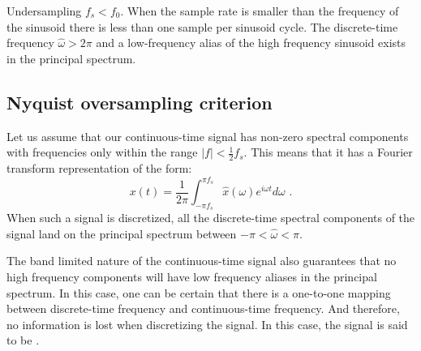 \begin{marginfigure}
\begin{center}
\end{center}
\caption{Undersampling $f_s < f_0$. When the sample rate is smaller than the frequency of the sinusoid there is less than one sample per sinusoid cycle. The discrete-time frequency $\hat{\omega}>2\pi$ and a low-frequency alias of the high frequency sinusoid exists in the principal spectrum.}
\label{fig:undersampling}
\end{marginfigure}

\subsection{Nyquist oversampling criterion}
Let us assume that our continuous-time signal has non-zero spectral components with frequencies only within the range $|f|<\frac{1}{2}f_s$. This means that it has a Fourier transform representation of the form:
\begin{equation}
    x(t) = \frac{1}{2\pi}\int_{-\pi f_s}^{\pi f_s} \hat{x}(\omega)
    e^{i\omega t}d\omega\,\,.
\end{equation}
When such a signal is discretized, all the discrete-time spectral components of the signal land on the principal spectrum between $-\pi <\hat{\omega} < \pi$.

The band limited nature of the continuous-time signal also guarantees that no high frequency components will have low frequency aliases in the principal spectrum. 
In this case, one can be certain that there is a one-to-one mapping between discrete-time frequency and continuous-time frequency. And therefore, 
no information is lost when discretizing the signal. In this case, the signal is said to be \emph{}.

